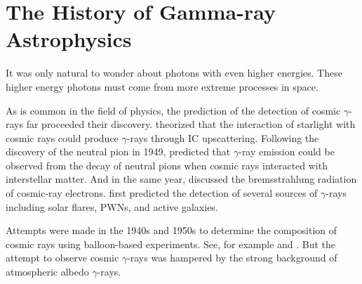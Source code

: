 \section{The History of Gamma-ray Astrophysics}

It was only natural to wonder about photons with even
higher energies. These higher energy photons must
come from more extreme processes in space.

As is common in the field of physics, the prediction of
the detection of cosmic $\gamma$-rays far proceeded their discovery.
\cite{feenberg_1948_interaction-cosmic-ray} theorized that the interaction
of starlight with cosmic rays could produce $\gamma$-rays through
\ac{IC} upscattering.  Following the discovery of the neutral
pion in 1949, \cite{hayakawa_1952_propagation-cosmic}
predicted that $\gamma$-ray emission could be observed from the
decay of neutral pions when cosmic rays interacted with interstellar
matter.  And in the same year, \cite{hutchinson_1952_possible-relation}
discussed the bremsstrahlung radiation of cosmic-ray electrons.
\cite{morrison_1958_gamma-ray-astronomy} first predicted the detection
of several sources of $\gamma$-rays including solar flares, \acp{PWN},
and active galaxies.

Attempts were made in the 1940s and 1950s to determine the
composition of cosmic rays using balloon-based experiments. See,
for example \cite{critchfield_1952_radiation-balloon} and
\cite{hulsizer_1948_search-electrons}.  But the attempt to observe
cosmic $\gamma$-rays was hampered by the strong background of atmospheric
albedo $\gamma$-rays.

